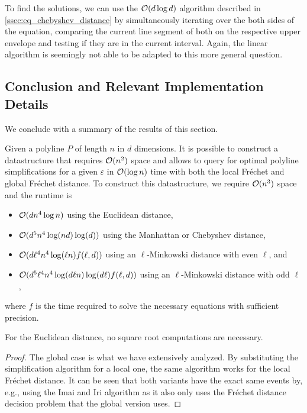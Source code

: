 To find the solutions, we can use the \(\mathcal{O}(d \log d)\) algorithm described in \cref{ssec:eq_chebyshev_distance} by simultaneously iterating over the both sides of the equation, comparing the current line segment of both on the respective upper envelope and testing if they are in the current interval. Again, the linear algorithm is seemingly not able to be adapted to this more general question.

\subsection{Conclusion and Relevant Implementation Details}
We conclude with a summary of the results of this section. 
\begin{theorem}\label{thm:query-ds}
	Given a polyline \(P\) of length \(n\) in \(d\) dimensions. It is possible to construct a datastructure that requires \(\mathcal{O}(n^2)\) space and allows to query for optimal polyline simplifications for a given \(\varepsilon\) in \(\mathcal{O}(\log n)\) time with both the local Fréchet and global Fréchet distance. To construct this datastructure, we require \(\mathcal{O}(n^3)\) space and the runtime is 
	\begin{itemize}
		\item \(\mathcal{O}(d n^4 \log n)\) using the Euclidean distance, 
		\item \(\mathcal{O}(d^5 n^4 \log(nd)\log(d))\) using the Manhattan or Chebyshev distance, 
		\item \(\mathcal{O}(d\ell^4 n^4 \log(\ell n)f(\ell, d))\) using an \(\ell\)-Minkowski distance with even \(\ell\), and 
		\item \(\mathcal{O}(d^5\ell^4 n^4 \log(d \ell n)\log(d \ell)f(\ell, d))\) using an \(\ell\)-Minkowski distance with odd \(\ell\),
	\end{itemize}

	where \(f\) is the time required to solve the necessary equations with sufficient precision.

	For the Euclidean distance, no square root computations are necessary.
\end{theorem}

\begin{proof}
  The global case is what we have extensively analyzed. By substituting the simplification algorithm for a local one, the same algorithm works for the local Fréchet distance. It can be seen that both variants have the exact same events by, e.g., using the Imai and Iri algorithm as it also only uses the Fréchet distance decision problem that the global version uses. 
\end{proof}

